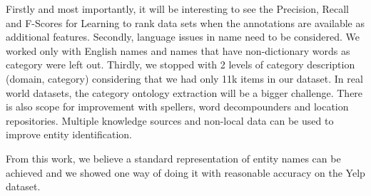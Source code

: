 \documentclass{acm_proc_article-sp}
\begin{document}
Firstly and most importantly, it will be interesting to see the Precision, Recall and F-Scores for Learning to rank data sets when the annotations are available as additional features. Secondly, language issues in name need to be considered. We worked only with English names and names that have non-dictionary words as category were left out. Thirdly, we stopped with 2 levels of category description (domain, category) considering that we had only 11k items in our dataset. In real world datasets, the category ontology extraction will be a bigger challenge. There is also scope for improvement with spellers, word decompounders and location repositories. Multiple knowledge sources and non-local data can be used to improve entity identification\cite{vilain-huggins-wellner:2009:RANLP09}.

From this work, we believe a standard representation of entity names can be achieved and we showed one way of doing it with reasonable accuracy on the Yelp dataset.


%
\small

%
%


\balancecolumns
\end{document}
